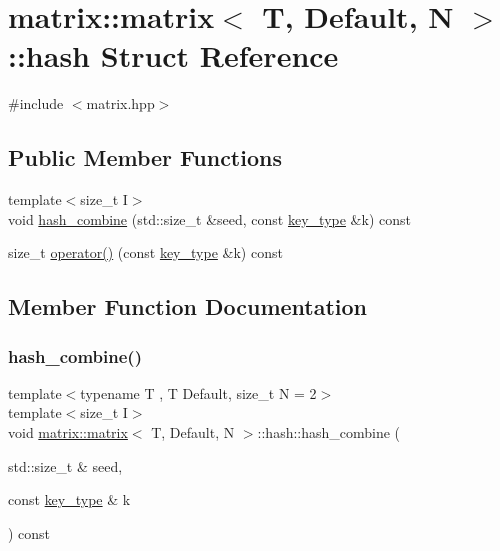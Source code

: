 \hypertarget{structmatrix_1_1matrix_1_1hash}{}\section{matrix\+:\+:matrix$<$ T, Default, N $>$\+:\+:hash Struct Reference}
\label{structmatrix_1_1matrix_1_1hash}


{\ttfamily \#include $<$matrix.\+hpp$>$}

\subsection*{Public Member Functions}
\begin{DoxyCompactItemize}
\item 
{\footnotesize template$<$size\+\_\+t I$>$ }\\void \hyperlink{structmatrix_1_1matrix_1_1hash_aedb1bc46b25632979d0f65514a36c6d7}{hash\+\_\+combine} (std\+::size\+\_\+t \&seed, const \hyperlink{structmatrix_1_1matrix_af7b5498ac1b615cb9ef51bd185a2557e}{key\+\_\+type} \&k) const
\item 
size\+\_\+t \hyperlink{structmatrix_1_1matrix_1_1hash_a85c814d52744c898763b5988498d5384}{operator()} (const \hyperlink{structmatrix_1_1matrix_af7b5498ac1b615cb9ef51bd185a2557e}{key\+\_\+type} \&k) const
\end{DoxyCompactItemize}


\subsection{Member Function Documentation}
\mbox{\label{structmatrix_1_1matrix_1_1hash_aedb1bc46b25632979d0f65514a36c6d7}} 
\subsubsection{\texorpdfstring{hash\+\_\+combine()}{hash\_combine()}}
{\footnotesize\ttfamily template$<$typename T , T Default, size\+\_\+t N = 2$>$ \\
template$<$size\+\_\+t I$>$ \\
void \hyperlink{structmatrix_1_1matrix}{matrix\+::matrix}$<$ T, Default, N $>$\+::hash\+::hash\+\_\+combine (\begin{DoxyParamCaption}\item[{std\+::size\+\_\+t \&}]{seed,  }\item[{const \hyperlink{structmatrix_1_1matrix_af7b5498ac1b615cb9ef51bd185a2557e}{key\+\_\+type} \&}]{k }\end{DoxyParamCaption}) const\hspace{0.3cm}{\ttfamily [inline]}}

